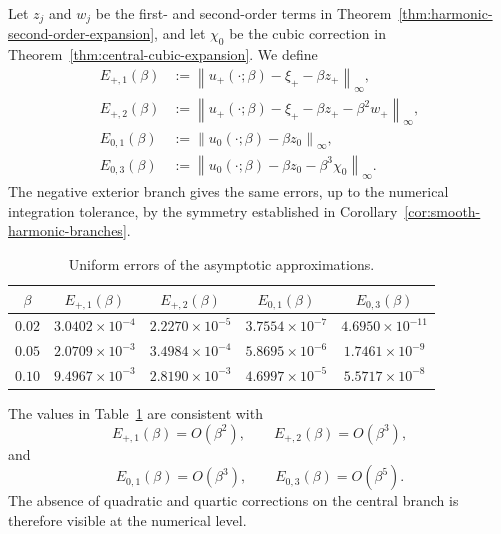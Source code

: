 Let $z_j$ and $w_j$ be the first- and second-order terms in
Theorem~\ref{thm:harmonic-second-order-expansion}, and let $\chi_0$ be
the cubic correction in
Theorem~\ref{thm:central-cubic-expansion}. We define
\begin{align}
 E_{+,1}(\beta)
 &:={}
 \left\|
 u_+(\cdot;\beta)
 -\xi_+
 -\beta z_+
 \right\|_{\infty},
 \label{eq:numerical-error-plus-one}
 \\
 E_{+,2}(\beta)
 &:={}
 \left\|
 u_+(\cdot;\beta)
 -\xi_+
 -\beta z_+
 -\beta^2w_+
 \right\|_{\infty},
 \label{eq:numerical-error-plus-two}
 \\
 E_{0,1}(\beta)
 &:={}
 \left\|
 u_0(\cdot;\beta)
 -\beta z_0
 \right\|_{\infty},
 \label{eq:numerical-error-zero-one}
 \\
 E_{0,3}(\beta)
 &:={}
 \left\|
 u_0(\cdot;\beta)
 -\beta z_0
 -\beta^3\chi_0
 \right\|_{\infty}.
 \label{eq:numerical-error-zero-three}
\end{align}
The negative exterior branch gives the same errors, up to the numerical
integration tolerance, by the symmetry established in
Corollary~\ref{cor:smooth-harmonic-branches}.

\begin{table}[htbp]
\centering
\caption{Uniform errors of the asymptotic approximations.}
\label{tab:numerical-asymptotic-errors}
\small
\setlength{\tabcolsep}{8pt}
\begin{tabular}{ccccc}
\hline
$\beta$
& $E_{+,1}(\beta)$
& $E_{+,2}(\beta)$
& $E_{0,1}(\beta)$
& $E_{0,3}(\beta)$
\\
\hline
$0.02$
& $3.0402\times10^{-4}$
& $2.2270\times10^{-5}$
& $3.7554\times10^{-7}$
& $4.6950\times10^{-11}$
\\
$0.05$
& $2.0709\times10^{-3}$
& $3.4984\times10^{-4}$
& $5.8695\times10^{-6}$
& $1.7461\times10^{-9}$
\\
$0.10$
& $9.4967\times10^{-3}$
& $2.8190\times10^{-3}$
& $4.6997\times10^{-5}$
& $5.5717\times10^{-8}$
\\
\hline
\end{tabular}
\end{table}

The values in Table~\ref{tab:numerical-asymptotic-errors} are consistent
with
\[
 E_{+,1}(\beta)=O(\beta^2),
 \qquad
 E_{+,2}(\beta)=O(\beta^3),
\]
and
\[
 E_{0,1}(\beta)=O(\beta^3),
 \qquad
 E_{0,3}(\beta)=O(\beta^5).
\]
The absence of quadratic and quartic corrections on the central branch
is therefore visible at the numerical level.

